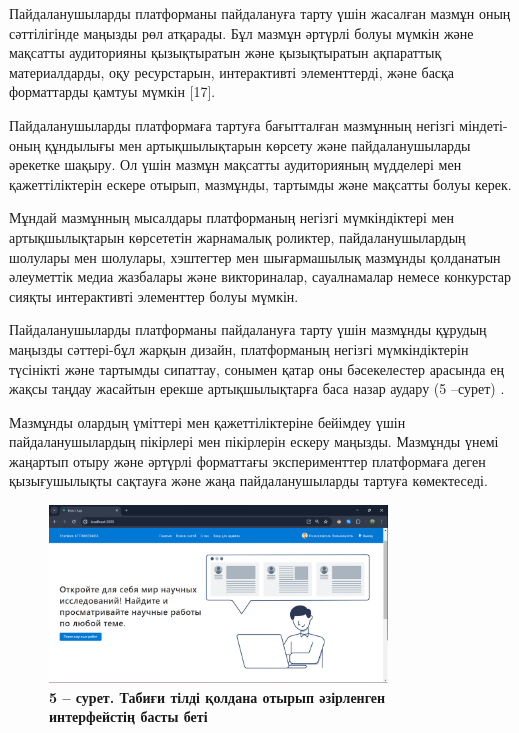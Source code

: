 Пайдаланушыларды платформаны пайдалануға тарту үшін жасалған мазмұн оның
сәттілігінде маңызды рөл атқарады. Бұл мазмұн әртүрлі болуы мүмкін және
мақсатты аудиторияны қызықтыратын және қызықтыратын ақпараттық
материалдарды, оқу ресурстарын, интерактивті элементтерді, және басқа
форматтарды қамтуы мүмкін {[}17{]}.

Пайдаланушыларды платформаға тартуға бағытталған мазмұнның негізгі
міндеті-оның құндылығы мен артықшылықтарын көрсету және пайдаланушыларды
әрекетке шақыру. Ол үшін мазмұн мақсатты аудиторияның мүдделері мен
қажеттіліктерін ескере отырып, мазмұнды, тартымды және мақсатты болуы
керек.

Мұндай мазмұнның мысалдары платформаның негізгі мүмкіндіктері мен
артықшылықтарын көрсететін жарнамалық роликтер, пайдаланушылардың
шолулары мен шолулары, хэштегтер мен шығармашылық мазмұнды қолданатын
әлеуметтік медиа жазбалары және викториналар, сауалнамалар немесе
конкурстар сияқты интерактивті элементтер болуы мүмкін.

Пайдаланушыларды платформаны пайдалануға тарту үшін мазмұнды құрудың
маңызды сәттері-бұл жарқын дизайн, платформаның негізгі мүмкіндіктерін
түсінікті және тартымды сипаттау, сонымен қатар оны бәсекелестер
арасында ең жақсы таңдау жасайтын ерекше артықшылықтарға баса назар
аудару (5 --сурет) .

Мазмұнды олардың үміттері мен қажеттіліктеріне бейімдеу үшін
пайдаланушылардың пікірлері мен пікірлерін ескеру маңызды. Мазмұнды
үнемі жаңартып отыру және әртүрлі форматтағы эксперименттер платформаға
деген қызығушылықты сақтауға және жаңа пайдаланушыларды тартуға
көмектеседі.

\begin{figure}[H]
	\centering
	\includegraphics[width=0.8\textwidth]{assets/146}
	\caption*{\bfseries 5 -- сурет. Табиғи тілді қолдана отырып әзірленген интерфейстің
  басты беті}
\end{figure}


